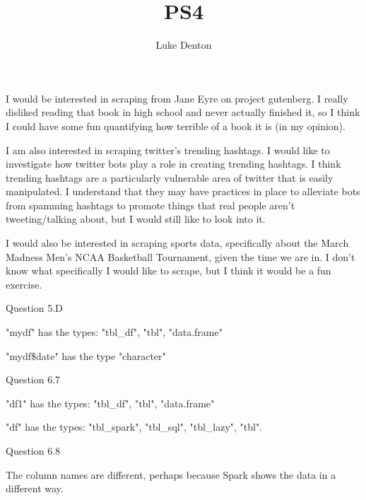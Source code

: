 \documentclass{homework}
\title{PS4}
\author{Luke Denton}
\begin{document}
\maketitle

\exercise
I would be interested in scraping from Jane Eyre on project gutenberg. I really disliked reading that book in high school and never actually finished it, so I think I could have some fun quantifying how terrible of a book it is (in my opinion).

I am also interested in scraping twitter's trending hashtags. I would like to investigate how twitter bots play a role in creating trending hashtags. I think trending hashtags are a particularly vulnerable area of twitter that is easily manipulated. I understand that they may have practices in place to alleviate bots from spamming hashtags to promote things that real people aren't tweeting/talking about, but I would still like to look into it. 

I would also be interested in scraping sports data, specifically about the March Madness Men's NCAA Basketball Tournament, given the time we are in. I don't know what specifically I would like to scrape, but I think it would be a fun exercise. 

\exercise*
Question 5.D

"mydf" has the types: "tbl\_df", "tbl", "data.frame"

"mydf\$date" has the type "character"


Question 6.7

"df1" has the types: "tbl\_df", "tbl", "data.frame"

"df" has the types: "tbl\_spark", "tbl\_sql", "tbl\_lazy", "tbl".

Question 6.8

The column names are different, perhaps because Spark shows the data in a different way.
\end{document}

